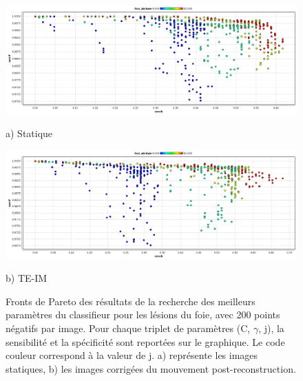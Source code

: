 \begin{figure}[h!]

\begin{center}
 \includegraphics[width=14cm]{images/pareto_mod_Static19.png}

{\small a) Statique}
\vspace{0.5cm}

 \includegraphics[width=14cm]{images/pareto_mod_IM19.png}

{\small b) TE-IM}

\end{center}
 \caption[(1/2) Fronts de Pareto des résultats de la recherche des meilleurs paramètres du classifieur pour les lésions du foie]{Fronts de Pareto des résultats de la recherche des meilleurs paramètres du classifieur pour les lésions du foie, avec 200 points négatifs par image. Pour chaque triplet de paramètres (C, $\gamma$, j), la sensibilité et la spécificité sont reportées sur le graphique. Le code couleur correspond à la valeur de j. a) représente les images statiques, b) les images corrigées du mouvement post-reconstruction.}
\label{fig:paretoModalite19_1}
\end{figure}

